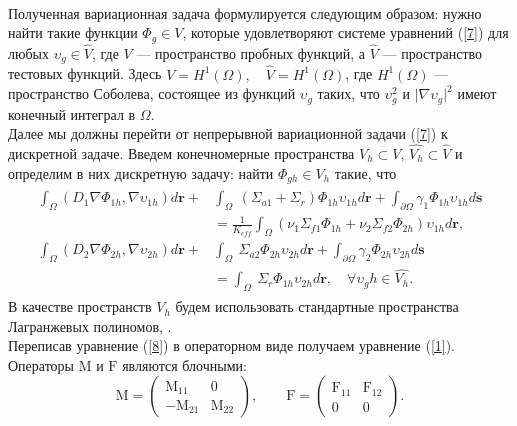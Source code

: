 \\
Полученная вариационная задача формулируется следующим образом: нужно найти такие функции $\Phi_g \in V$, которые удовлетворяют системе уравнений (\ref{7}) для любых $\upsilon_g \in \hat{V}$, где $V$ --- пространство пробных функций, а $\hat{V}$ --- пространство тестовых функций. Здесь $V = H^1(\Omega), \quad \hat{V} = H^1(\Omega)$, где $H^1(\Omega)$ --- пространство Соболева, состоящее из функций $\upsilon_g$ таких, что $\upsilon_g^2$ и  $\vert\nabla\upsilon_g\vert^2$ имеют конечный интеграл в $\Omega$. \\
Далее мы должны перейти от непрерывной вариационной задачи (\ref{7}) к дискретной задаче. Введем конечномерные пространства $V_h \subset V$, $\hat{V_h} \subset \hat{V}$ и определим в них дискретную задачу: найти $\Phi_{gh} \in V_h$ такие, что
\begin{align}\label{8}
\begin{split}
\int_\Omega (D_1 \nabla \Phi_{1h}, \nabla \upsilon_{1h} ) d\bm{r} + &\int_\Omega\ (\Sigma_{a1} + \Sigma_r)\Phi_{1h} \upsilon_{1h} d\bm{r} + \int_{\partial \Omega} \gamma_1 \Phi_{1h} \upsilon_{1h} d\bm{s}\\
&= \frac{1}{K_{eff}} \int_\Omega (\nu_1 \Sigma_{f1} \Phi_{1h} + \nu_2 \Sigma_{f2} \Phi_{2h}) \upsilon_{1h} d\bm{r},\\
\int_\Omega (D_2 \nabla \Phi_{2h}, \nabla \upsilon_{2h} ) d\bm{r} + &\int_\Omega\ \Sigma_{a2} \Phi_{2h} \upsilon_{2h} d\bm{r} + \int_{\partial \Omega} \gamma_2 \Phi_{2h} \upsilon_{2h} d\bm{s}\\
&= \int_\Omega\ \Sigma_r \Phi_{1h} \upsilon_{2h} d\bm{r}, \quad \forall \upsilon_gh \in \hat{V_h}.
\end{split}
\end{align}
В качестве пространств $V_h$ будем использовать стандартные пространства Лагранжевых полиномов\cite{quarteroni}, \cite{brenner}.\\  
Переписав уравнение (\ref{8}) в операторном виде получаем уравнение (\ref{1}). Операторы $\mathrm{M}$ и $\mathrm{F}$ являются блочными:
\begin{equation}\label{9}
\mathrm{M} = \begin{pmatrix} \mathrm{M}_{11} & 0 \\ -\mathrm{M}_{21} & \mathrm{M}_{22} \end{pmatrix},
\qquad
\mathrm{F} = \begin{pmatrix} \mathrm{F}_{11} & \mathrm{F}_{12} \\ 0 & 0 \end{pmatrix}.
\end{equation}
